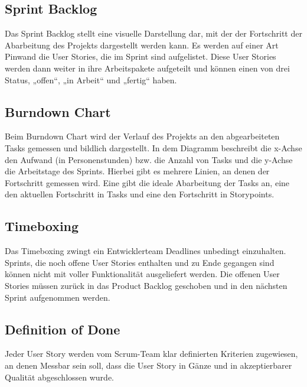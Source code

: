 \subsection{Sprint Backlog}
Das Sprint Backlog stellt eine visuelle Darstellung dar, mit der der Fortschritt der Abarbeitung des Projekts dargestellt werden kann. Es werden auf einer Art Pinwand die User Stories, die im Sprint sind aufgelistet. Diese User Stories werden dann weiter in ihre Arbeitspakete aufgeteilt und können einen von drei Status, „offen“, „in Arbeit“ und „fertig“ haben.
\subsection{Burndown Chart}
Beim Burndown Chart wird der Verlauf des Projekts an den abgearbeiteten Tasks gemessen und bildlich dargestellt. In dem Diagramm beschreibt die x-Achse den Aufwand (in Personenstunden) bzw. die Anzahl von Tasks und die y-Achse die Arbeitstage des Sprints. 
Hierbei gibt es mehrere Linien, an denen der Fortschritt gemessen wird. Eine gibt die ideale Abarbeitung der Tasks an, eine den aktuellen Fortschritt in Tasks und eine den Fortschritt in Storypoints.
\newpage
\subsection{Timeboxing}
Das Timeboxing zwingt ein Entwicklerteam Deadlines unbedingt einzuhalten. Sprints, die noch offene User Stories enthalten und zu Ende gegangen sind können nicht mit voller Funktionalität ausgeliefert werden. Die offenen User Stories müssen zurück in das Product Backlog geschoben und in den nächsten Sprint aufgenommen werden.
\subsection{Definition of Done}
Jeder User Story werden vom Scrum-Team klar definierten Kriterien zugewiesen, an denen Messbar sein soll, dass die User Story in Gänze und in akzeptierbarer Qualität abgeschlossen wurde.
